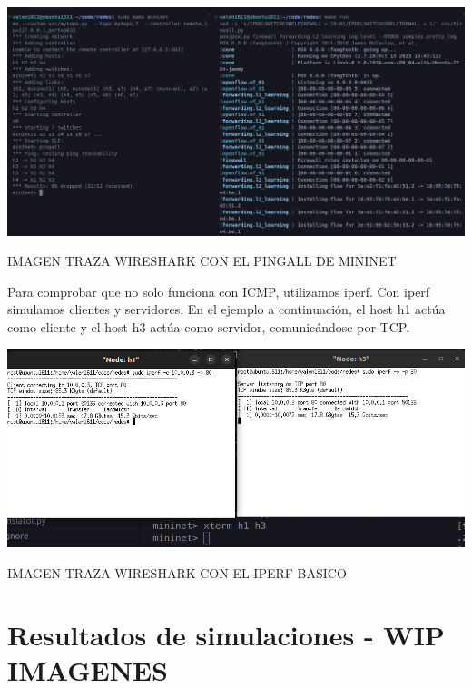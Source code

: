 \documentclass{article}
\begin{document}
\begin{center}
    \includegraphics[scale=0.23]{images/mininet_pingall.png}
\end{center}

IMAGEN TRAZA WIRESHARK CON EL PINGALL DE MININET
\begin{center}
\end{center}

Para comprobar que no solo funciona con ICMP, utilizamos iperf. Con iperf simulamos clientes y servidores. En el ejemplo a continuación, el host h1 actúa como cliente y el host h3 actúa como servidor, comunicándose por TCP.

\begin{center}
\includegraphics[scale=0.37]{images/mininet_iperf_basico.png}
\end{center}

IMAGEN TRAZA WIRESHARK CON EL IPERF BASICO
\begin{center}
\end{center}

\newpage
\section{Resultados de simulaciones - WIP IMAGENES}\label{pruebas-wip}
\end{document}
